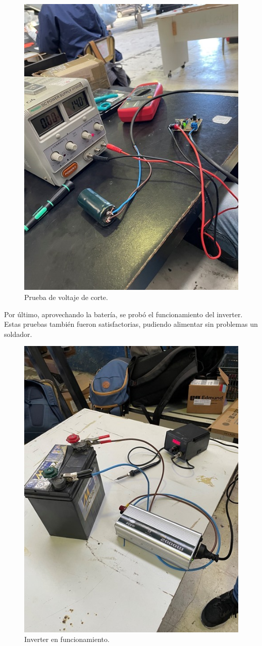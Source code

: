 \begin{figure}[H]
    \centering
    \includegraphics[width=0.5\linewidth]{informes/IMG_8118.jpg}
    \caption{Prueba de voltaje de corte.}
    
\end{figure}

Por último, aprovechando la batería, se probó el funcionamiento del inverter. Estas pruebas también fueron satisfactorias, pudiendo alimentar sin problemas un soldador.\\

\begin{figure}[H]
    \centering
    \includegraphics[width=0.75\linewidth]{informes/IMG_8121.jpg}
    \caption{Inverter en funcionamiento.}
    
\end{figure}

